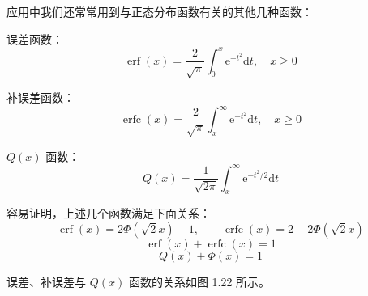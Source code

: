 \documentclass[11pt,openany,UTF8]{ctexbook}
\newcommand{\dif}{\mathrm{d}}                      %
\newcommand{\eu}{\mathrm{e}}                       %
\begin{document}
应用中我们还常常用到与正态分布函数有关的其他几种函数\nobreak：

误差函数\nobreak：
\begin{equation}
\operatorname{erf}(x)=\frac{2}{\sqrt{\pi}}\int_{0}^{x}\eu^{-t^2}\dif t,\quad x\geqslant 0
\label{eq:1.70}
\end{equation}

补误差函数\nobreak：
\begin{equation}
\operatorname{erfc}(x)=\frac{2}{\sqrt{\pi}}\int_{x}^{\infty}\eu^{-t^2}\dif t,\quad x\geqslant 0
\label{eq:1.71}
\end{equation}

$Q(x)$ 函数\nobreak：
\begin{equation}
Q(x)=\frac{1}{\sqrt{2\pi}}\int_{x}^{\infty}\eu^{-t^2/2}\dif t
\label{eq:1.72}
\end{equation}

容易证明\nobreak，上述几个函数满足下面关系\nobreak：
\begin{equation}
\operatorname{erf}(x)=2\Phi(\sqrt{2}x)-1,\qquad \operatorname{erfc}(x)=2-2\Phi(\sqrt{2}x)
\label{eq:1.73}
\end{equation}
\begin{equation}
\operatorname{erf}(x)+\operatorname{erfc}(x)=1
\label{eq:1.74}
\end{equation}
\begin{equation}
Q(x)+\Phi(x)=1
\label{eq:1.75}
\end{equation}

误差\nobreak、补误差与 $Q(x)$ 函数的关系如图 1.22 所示\nobreak。
\end{document}
